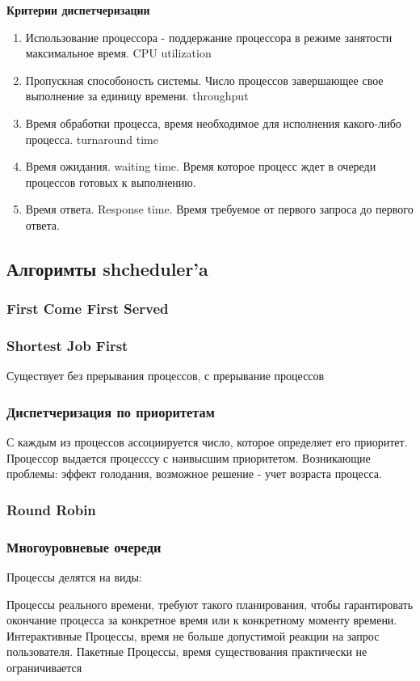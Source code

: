 \documentclass[a4paper]{article}
\begin{document}
\textbf{Критерии диспетчеризации}
\begin{enumerate}
    \item Использование процессора - поддержание процессора в режиме занятости максимальное время. CPU utilization
    \item Пропускная способоность системы. Число процессов завершающее свое выполнение за единицу времени. throughput
    \item Время обработки процесса, время необходимое для исполнения какого-либо процесса. turnaround time
    \item Время ожидания. waiting time. Время которое процесс ждет в очереди процессов готовых к выполнению.
    \item Время ответа. Response time. Время требуемое от первого запроса до первого ответа.
\end{enumerate}

\subsection{Алгоримты shcheduler'a}
\subsubsection{First Come First Served}
\subsubsection{Shortest Job First}
    Существует без прерывания процессов, с прерывание процессов
\subsubsection{Диспетчеризация по приоритетам}
    С каждым из процессов ассоциируется число, которое определяет его приоритет. 
    Процессор выдается процесссу с наивысшим приоритетом.
    Возникающие проблемы: эффект голодания, возможное решение - учет возраста процесса.
\subsubsection{Round Robin}

\subsubsection{Многоуровневые очереди}
Процессы делятся на виды:
\begin{enumerate}
    Процессы реального времени, требуют такого планирования, чтобы гарантировать окончание процесса за конкретное время или к конкретному моменту времени. 
    Интерактивные Процессы, время не больше допустимой реакции на запрос пользователя.
    Пакетные Процессы, время существования практически не ограничивается    
\end{enumerate}
\end{document}

